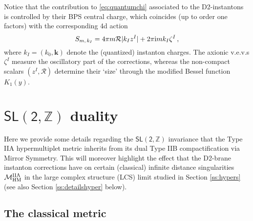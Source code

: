 Notice that the contribution to \eqref{eq:quantumchi} associated to the D2-instantons is controlled by their BPS central charge, which coincides (up to order one factors) with the corresponding 4d action
%
\begin{equation}\label{eq:D2instantonaction}
	S_{m,\, k_I} = 4\pi m \mathcal{R} |k_I z^I| + 2\pi {\rm i} m k_I \zeta^I\, ,
\end{equation}
%
where $k_I=(k_0, \mathbf{k})$ denote the (quantized) instanton charges. The axionic v.e.v.s $\zeta^I$ measure the oscillatory part of the corrections, whereas the non-compact scalars $(z^I, \mathcal{R})$ determine their `size' through the modified Bessel function $K_1(y)$.
	
\section{$\mathsf{SL(2,\mathbb{Z})}$ duality}
\label{ss:SL2Z}
	
Here we provide some details regarding the $\mathsf{SL(2,\mathbb{Z})}$ invariance that the Type IIA hypermultiplet metric inherits from its dual Type IIB compactification via Mirror Symmetry. This will moreover highlight the effect that the D2-brane instanton corrections have on certain (classical) infinite distance singularities $\mathcal{M}_{\rm HM}^{\rm IIA}$ in the large complex structure (LCS) limit studied in Section \ref{ss:hypers} (see also Section \ref{ss:detailshyper} below).
	
\subsection{The classical metric}
	
